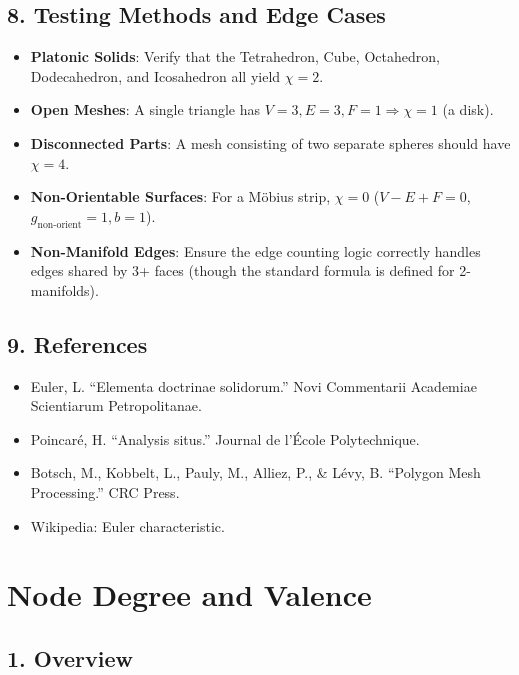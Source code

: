 \subsection{8. Testing Methods and Edge Cases}

\begin{itemize}
    \item \textbf{Platonic Solids}: Verify that the Tetrahedron, Cube, Octahedron, Dodecahedron, and Icosahedron all yield $\chi = 2$.
    \item \textbf{Open Meshes}: A single triangle has $V=3, E=3, F=1 \Rightarrow \chi=1$ (a disk).
    \item \textbf{Disconnected Parts}: A mesh consisting of two separate spheres should have $\chi = 4$.
    \item \textbf{Non-Orientable Surfaces}: For a M\"obius strip, $\chi = 0$ ($V-E+F = 0$, $g_{\text{non-orient}}=1, b=1$).
    \item \textbf{Non-Manifold Edges}: Ensure the edge counting logic correctly handles edges shared by 3+ faces (though the standard formula is defined for 2-manifolds).
\end{itemize}

\subsection{9. References}

\begin{itemize}
    \item Euler, L. \cite{euler1758} ``Elementa doctrinae solidorum.'' Novi Commentarii Academiae Scientiarum Petropolitanae.
    \item Poincar\'e, H. \cite{poincare1895} ``Analysis situs.'' Journal de l'\'Ecole Polytechnique.
    \item Botsch, M., Kobbelt, L., Pauly, M., Alliez, P., \& L\'evy, B. \cite{botsch2010} ``Polygon Mesh Processing.'' CRC Press.
    \item Wikipedia: Euler characteristic.
\end{itemize}

\section{Node Degree and Valence}
\label{sec:node_degree}

\subsection{1. Overview}

